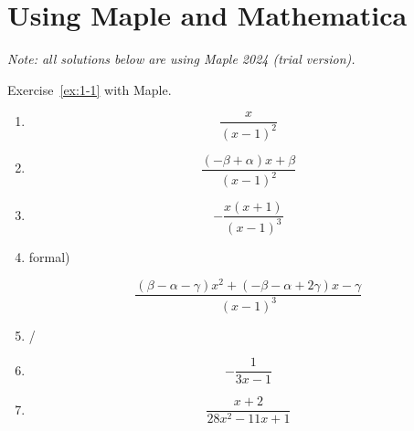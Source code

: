 \section{Using Maple and Mathematica}
\emph{Note: all solutions below are using Maple 2024 (trial version).}

\begin{exercise}
    Exercise~\ref{ex:1-1} with Maple.
\end{exercise}
\begin{solution}
    \begin{enumerate}[label=(\alph*)]
        \item \begin{mapleinput}
\end{mapleinput} \begin{mapleoutput}
               \[\frac{x}{(x-1)^2}\]
               \end{mapleoutput}   
        \item \begin{mapleinput}
\end{mapleinput} \begin{mapleoutput}
            \[\frac{(-\beta+\alpha)x+\beta}{(x-1)^2}\] \end{mapleoutput}
        \item \begin{mapleinput}
\end{mapleinput} \begin{mapleoutput}
    \[-\frac{x(x+1)}{(x-1)^3}\]
\end{mapleoutput}
        \item \begin{mapleinput}
  formal)
\end{mapleinput} \begin{mapleoutput}
            \[\frac{\left(\beta -\alpha -\gamma \right) x^{2}+\left(-\beta -\alpha +2 \gamma \right) x-\gamma}{\left(x-1\right)^{3}}\]
        \end{mapleoutput}
    \item /
    \item \begin{mapleinput}
\end{mapleinput} \begin{mapleoutput}
        \[-\frac{1}{3 x-1}\]
    \end{mapleoutput}
    \item \begin{mapleinput}
\end{mapleinput} \begin{mapleoutput}
    \[\frac{x+2}{28 x^{2}-11 x+1}\]
\end{mapleoutput}
    \end{enumerate}
\end{solution}

